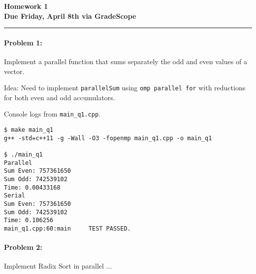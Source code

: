 \documentclass[12pt,letterpaper,twoside]{article}
\begin{document}
{\centering \textbf{Homework 1\\ Due Friday, April 8th via GradeScope\\}}
\vspace*{-8pt}\noindent\rule{\linewidth}{1pt}

\paragraph{Problem 1: } Implement a parallel function that sums separately the odd
and even values of a vector. 

Idea: Need to implement \texttt{parallelSum} using \texttt{omp parallel for} with 
reductions for both even and odd accumulators.


Console logs from \texttt{main\_q1.cpp}.
\begin{verbatim}
$ make main_q1
g++ -std=c++11 -g -Wall -O3 -fopenmp main_q1.cpp -o main_q1

$ ./main_q1
Parallel
Sum Even: 757361650
Sum Odd: 742539102
Time: 0.00433168
Serial
Sum Even: 757361650
Sum Odd: 742539102
Time: 0.106256
main_q1.cpp:60:main     TEST PASSED.
\end{verbatim}


\paragraph{Problem 2: } Implement Radix Sort in parallel ...
\end{document}
